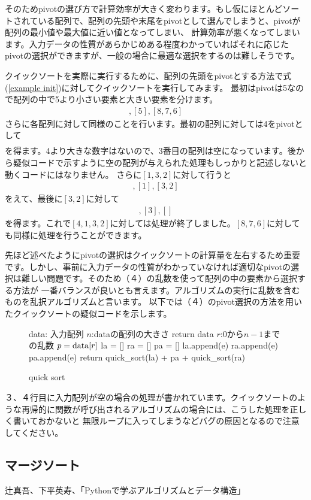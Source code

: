 \documentclass[dvipdfmx,pic,eepic,ecltree]{jarticle}
\begin{document}
そのためpivotの選び方で計算効率が大きく変わります。もし仮にほとんどソートされている配列で、配列の先頭や末尾をpivotとして選んでしまうと、pivotが配列の最小値や最大値に近い値となってしまい、
計算効率が悪くなってしまいます。入力データの性質があらかじめある程度わかっていればそれに応じたpivotの選択ができますが、一般の場合に最適な選択をするのは難しそうです。

クイックソートを実際に実行するために、配列の先頭をpivotとする方法で式(\ref{example init})に対してクイックソートを実行してみます。
最初はpivotは5なので配列の中で5より小さい要素と大きい要素を分けます。
\begin{eqnarray}
[4, 1, 3, 2] , [5] , [8, 7, 6]
\end{eqnarray}
さらに各配列に対して同様のことを行います。最初の配列に対しては4をpivotとして
\begin{eqnarray}
[1, 3, 2]  [4]  []
\end{eqnarray}
を得ます。4より大きな数字はないので、3番目の配列は空になっています。後から疑似コードで示すように空の配列が与えられた処理もしっかりと記述しないと
動くコードにはなりません。
さらに$[1,3,2]$に対して行うと
\begin{eqnarray}
[] , [1] , [3, 2]
\end{eqnarray}
をえて、最後に$[3, 2]$に対して
\begin{eqnarray}
[2] , [3] , []
\end{eqnarray}
を得ます。これで$[4, 1, 3, 2]$に対しては処理が終了しました。$ [8, 7, 6]$に対しても同様に処理を行うことができます。

先ほど述べたようにpivotの選択はクイックソートの計算量を左右するため重要です。しかし、事前に入力データの性質がわかっていなければ適切なpivotの選択は難しい問題です。そのため（４）の乱数を使って配列の中の要素から選択する方法が
一番バランスが良いとも言えます。アルゴリズムの実行に乱数を含むものを乱択アルゴリズムと言います。
以下では（４）のpivot選択の方法を用いたクイックソートの疑似コードを示します。
\begin{figure}[H]
\begin{algorithm}[H]
	\caption{quick sort}
	\label{quick sort}
	\begin{algorithmic}[1] 
	\STATE data: 入力配列
	\STATE $n$:dataの配列の大きさ
	\STATE return data
	\ENDIF
	\STATE $r$:$0$から$n-1$までの乱数
	\STATE $p = {\rm data}[r]$
	\STATE la = []
	\STATE ra = []
	\STATE pa = []
    	\STATE la.append(e)
	\ELSE
	\STATE ra.append(e)
	\ELSE
	\STATE pa.append(e)
	\ENDIF
	\ENDIF
	\ENDFOR
	\STATE return quick\_sort(la) + pa + quick\_sort(ra)
	\end{algorithmic}
\end{algorithm}
\end{figure}
３、４行目に入力配列が空の場合の処理が書かれています。クイックソートのような再帰的に関数が呼び出されるアルゴリズムの場合には、こうした処理を正しく書いておかないと
無限ループに入ってしまうなどバグの原因となるので注意してください。
\subsection{マージソート}


\begin{thebibliography}{9}
\item 辻真吾、下平英寿、「Pythonで学ぶアルゴリズムとデータ構造」
\end{thebibliography}
\end{document}
